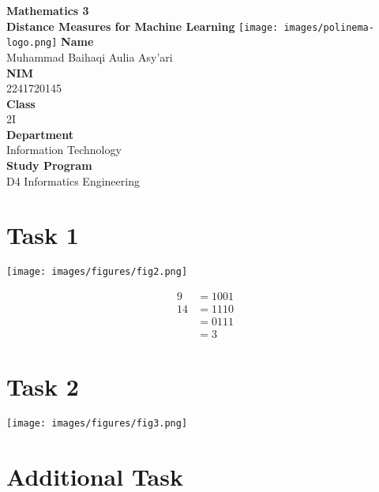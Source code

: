 \documentclass[12pt,titlepage]{article}
\newcommand{\vSubject}{Mathematics 3}
\newcommand{\vSubtitle}{Distance Measures for Machine Learning}
\newcommand{\vName}{Muhammad Baihaqi Aulia Asy'ari}
\newcommand{\vNIM}{2241720145}
\newcommand{\vClass}{2I}
\newcommand{\vDepartment}{Information Technology}
\newcommand{\vStudyProgram}{D4 Informatics Engineering}
\begin{document}
\begin{titlepage}
    \centering
    \vfill
    {\bfseries\LARGE
        \vSubject\\
        \vskip0.25cm
        \vSubtitle
    }
    \vfill
    \texttt{[image: images/polinema-logo.png]}
    \vfill
    {
        \textbf{Name}\\
        \vName\\
        \vskip0.5cm
        \textbf{NIM}\\
        \vNIM\\
        \vskip0.5cm
        \textbf{Class}\\
        \vClass\\
        \vskip0.5cm
        \textbf{Department}\\
        \vDepartment\\
        \vskip0.5cm
        \textbf{Study Program}\\
        \vStudyProgram
    }
\end{titlepage}

\newpage

\section*{Task 1}

\texttt{[image: images/figures/fig2.png]}

\begin{align*}
    9 &= 1001 \\
    14 &= 1110 \\
    &= 0111 \\
    &= 3
\end{align*}

\section*{Task 2}

\texttt{[image: images/figures/fig3.png]}

\newpage

\section*{Additional Task}
\end{document}
